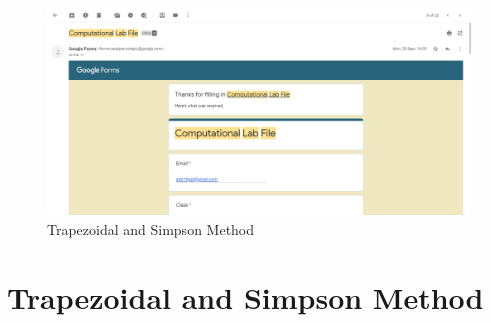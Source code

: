 \documentclass{article}
\begin{document}
\clearpage
\begin{figure}[h]
    \centering
    \includegraphics[width=15cm,height=7cm \textwidth]{1.PNG}
\caption{Trapezoidal and Simpson Method}
\end{figure}
\section{Trapezoidal and Simpson Method}

\end{document}
